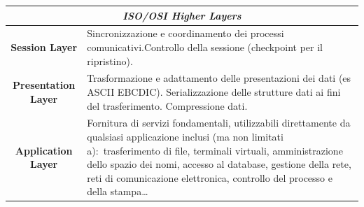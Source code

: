 \begin{table}[H]
    \centering
    \begin{tabular}{|c|m{22.7em}|}
        \hline
        \multicolumn{2}{|c|}{\textit{ISO/OSI Higher Layers}}                                                                                                                                                                                                                                                                                                         \\\hline\hline
        \textbf{Session Layer}      & Sincronizzazione e coordinamento dei processi comunicativi.\newline Controllo della sessione (checkpoint per il ripristino).                                                                                                                                                                                                   \\\hline
        \textbf{Presentation Layer} & Trasformazione e adattamento delle presentazioni dei dati (es ASCII EBCDIC). \newline Serializzazione delle strutture dati ai fini del trasferimento. \newline Compressione dati.                                                                                                                                              \\\hline
        \textbf{Application Layer}  & Fornitura di servizi fondamentali, utilizzabili direttamente da qualsiasi applicazione inclusi (ma non limitati a):\ trasferimento di file, terminali virtuali, amministrazione dello spazio dei nomi, accesso al database, gestione della rete, reti di comunicazione elettronica, controllo del processo e della stampa\dots \\\hline
    \end{tabular}
\end{table}

